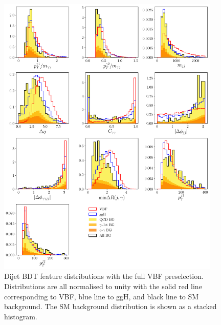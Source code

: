 \begin{figure}[h!]
    \includegraphics[width=0.95\textwidth]{figures/event_selection/dijet_BDT_features_splitBG_PS.pdf}
    \caption{Dijet BDT feature distributions with the full VBF preselection. Distributions are all normalised to unity with the solid red line corresponding to VBF, blue line to ggH, and black line to SM background. The SM background distribution is shown as a stacked histogram.}
    \label{fig:event_categorisaton:dijet_bdt_features}
\end{figure}


